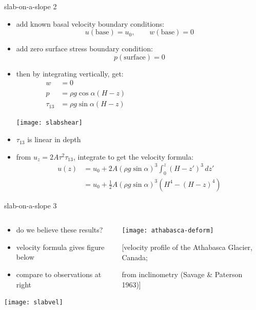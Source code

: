 \documentclass[10pt,dvipsnames]{beamer}
\begin{document}
\begin{frame}{slab-on-a-slope 2}

\begin{itemize}
\item add known basal velocity boundary conditions:
	$$u(\text{base})=u_0, \qquad w(\text{base})=0$$
\item add zero surface stress boundary condition:
	$$p(\text{surface})=0$$
\item then by integrating vertically, get:
\begin{align*}
w &= 0 \phantom{asdfklj asldkfjalk asdfkj sdlfkj sldafkj adlfjl sdfakj }\\
p &= \rho g \cos\alpha (H-z) \\
\tau_{13} &= \rho g \sin\alpha (H-z)
\end{align*}

\vspace{-25mm}
\hfill \texttt{[image: slabshear]}

\vspace{-2mm}
\item $\tau_{13}$ is linear in depth

\medskip
\item from $u_z = 2 A \tau^2 \tau_{13}$, integrate to get the \alert{velocity formula}:
\vspace{-0.05in}
\begin{align*}
u(z) &= u_0 + 2 A (\rho g \sin\alpha)^3 \int_0^z (H-z')^3\,dz' \\
     &= u_0 + \frac{1}{2} A (\rho g \sin\alpha)^3  \left(H^4 - (H-z)^4\right)
\end{align*}
\end{itemize}
\end{frame}


\begin{frame}{slab-on-a-slope 3}

\begin{columns}
\begin{column}{0.6\textwidth}
\begin{itemize}
\item do we believe these results?
\item velocity formula gives figure below
\item compare to observations at right
\end{itemize}
\begin{center}
\texttt{[image: slabvel]}
\end{center}
\end{column}

\begin{column}{0.4\textwidth}
\texttt{[image: athabasca-deform]}

\medskip
\tiny [velocity profile of the Athabasca Glacier, Canada;

from inclinometry (Savage \& Paterson 1963)]
\end{column}
\end{columns}
\end{frame}
\end{document}
